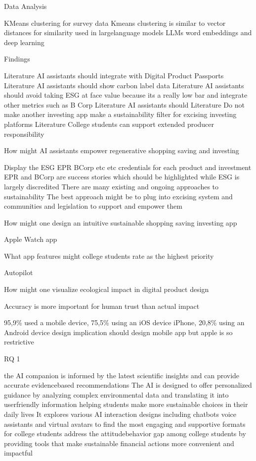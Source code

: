 \documentclass[
  letterpaper,
  DIV=11,
  numbers=noendperiod]{scrartcl}
\begin{document}
Data Analysis

KMeans clustering for survey data Kmeans clustering is similar to vector
distances for similarity used in largelanguage models LLMs word
embeddings and deep learning

Findings

Literature AI assistants should integrate with Digital Product Passports
Literature AI assistants should show carbon label data Literature AI
assistants should avoid taking ESG at face value because its a really
low bar and integrate other metrics such as B Corp Literature AI
assistants should Literature Do not make another investing app make a
sustainability filter for excising investing platforms Literature
College students can support extended producer responsibility

How might AI assistants empower regenerative shopping saving and
investing

Display the ESG EPR BCorp etc etc credentials for each product and
investment EPR and BCorp are success stories which should be highlighted
while ESG is largely discredited There are many existing and ongoing
approaches to sustainability The best approach might be to plug into
excising system and communities and legislation to support and empower
them

How might one design an intuitive sustainable shopping saving investing
app

Apple Watch app

What app features might college students rate as the highest priority

Autopilot

How might one visualize ecological impact in digital product design

Accuracy is more important for human trust than actual impact

95,9\% used a mobile device, 75,5\% using an iOS device iPhone, 20,8\%
using an Android device design implication should design mobile app but
apple is so restrictive

RQ 1

the AI companion is informed by the latest scientific insights and can
provide accurate evidencebased recommendations The AI is designed to
offer personalized guidance by analyzing complex environmental data and
translating it into userfriendly information helping students make more
sustainable choices in their daily lives It explores various AI
interaction designs including chatbots voice assistants and virtual
avatars to find the most engaging and supportive formats for college
students address the attitudebehavior gap among college students by
providing tools that make sustainable financial actions more convenient
and impactful
\end{document}
